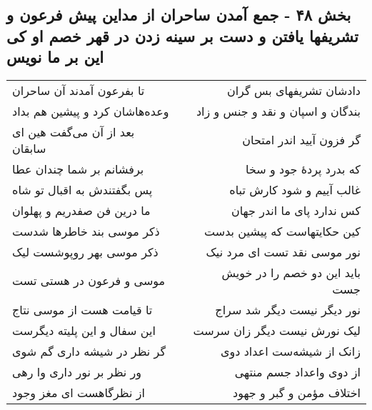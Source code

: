\begin{center}
\section*{بخش ۴۸ - جمع آمدن ساحران از مداین پیش فرعون و تشریفها یافتن و دست بر سینه زدن در قهر  خصم او کی این بر ما نویس}
\label{sec:sh048}
\begin{longtable}{l p{0.5cm} r}
تا بفرعون آمدند آن ساحران
&&
دادشان تشریفهای بس گران
\\
وعده‌هاشان کرد و پیشین هم بداد
&&
بندگان و اسپان و نقد و جنس و زاد
\\
بعد از آن می‌گفت هین ای سابقان
&&
گر فزون آیید اندر امتحان
\\
برفشانم بر شما چندان عطا
&&
که بدرد پردهٔ جود و سخا
\\
پس بگفتندش به اقبال تو شاه
&&
غالب آییم و شود کارش تباه
\\
ما درین فن صفدریم و پهلوان
&&
کس ندارد پای ما اندر جهان
\\
ذکر موسی بند خاطرها شدست
&&
کین حکایتهاست که پیشین بدست
\\
ذکر موسی بهر روپوشست لیک
&&
نور موسی نقد تست ای مرد نیک
\\
موسی و فرعون در هستی تست
&&
باید این دو خصم را در خویش جست
\\
تا قیامت هست از موسی نتاج
&&
نور دیگر نیست دیگر شد سراج
\\
این سفال و این پلیته دیگرست
&&
لیک نورش نیست دیگر زان سرست
\\
گر نظر در شیشه داری گم شوی
&&
زانک از شیشه‌ست اعداد دوی
\\
ور نظر بر نور داری وا رهی
&&
از دوی واعداد جسم منتهی
\\
از نظرگاهست ای مغز وجود
&&
اختلاف مؤمن و گبر و جهود
\\
\end{longtable}
\end{center}
